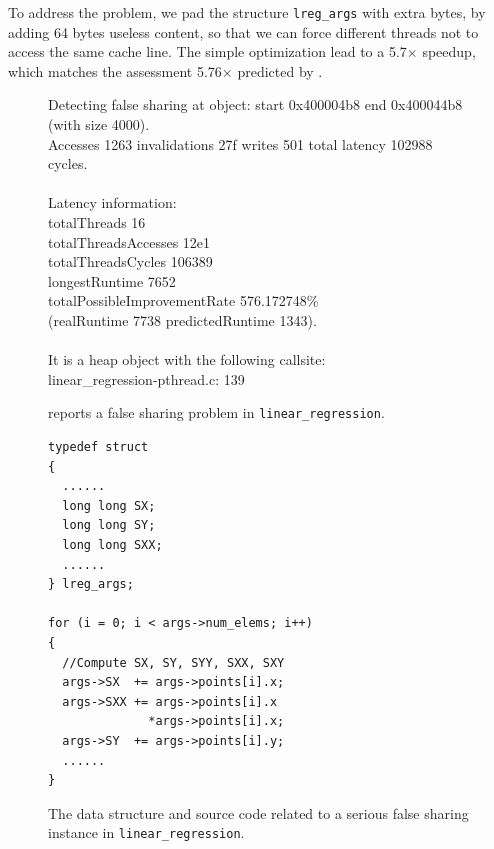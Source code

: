 To address the problem, we pad the structure {\tt lreg\_args} with extra bytes, by adding 64 bytes useless content, so that we can force different threads not to access the same cache line. The simple optimization lead to a 5.7$\times$ speedup, which matches the assessment 5.76$\times$ predicted by \cheetah{}.

\begin{figure}
\begin{minipage}{\columnwidth}

\centering

\fbox
{
\begin{minipage}{3in}
Detecting false sharing at object: start 0x400004b8 end 0x400044b8 (with size 4000). \\
Accesses 1263 invalidations 27f writes 501 total latency 102988 cycles.\\
\\
Latency information: \\
totalThreads 16 \\
totalThreadsAccesses 12e1 \\
totalThreadsCycles 106389 \\
longestRuntime 7652 \\
totalPossibleImprovementRate 576.172748\% \\
(realRuntime 7738 predictedRuntime 1343).\\
\\
It is a heap object with the following callsite:\\
linear\_regression-pthread.c: 139
\end{minipage}
}
\vspace{1em}
\caption{\cheetah{} reports a false sharing problem in \texttt{linear\_regression}.}
\label{fig:lr}
\end{minipage}
\end{figure}


\begin{figure}
\begin{verbatim}
typedef struct
{
  ......  
  long long SX;
  long long SY;
  long long SXX;
  ......
} lreg_args;	

for (i = 0; i < args->num_elems; i++)
{
  //Compute SX, SY, SYY, SXX, SXY
  args->SX  += args->points[i].x;
  args->SXX += args->points[i].x
              *args->points[i].x;
  args->SY  += args->points[i].y;
  ......
}
\end{verbatim}
\caption{The data structure and source code related to a serious false sharing instance in \texttt{linear\_regression}.}
\label{lr:code}
\end{figure}

